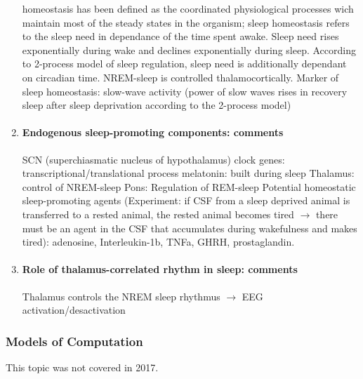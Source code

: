 \documentclass[12pt,article,oneside,a4paper]{memoir}
\begin{document}
\begin{enumerate}
homeostasis has been defined as the coordinated physiological processes wich
maintain most of the steady states in the organism; sleep homeostasis refers to
the sleep need in dependance of the time spent awake. Sleep need rises
exponentially during wake and declines exponentially during sleep. According to
2-process model of sleep regulation, sleep need is additionally dependant on
circadian time.
NREM-sleep is controlled thalamocortically.
Marker of sleep homeostasis: slow-wave activity (power of slow waves rises in
recovery sleep after sleep deprivation according to the 2-process model)

\item \paragraph{Endogenous sleep-promoting components: comments}

SCN (superchiasmatic nucleus of hypothalamus)
clock genes: transcriptional/translational process
melatonin: built during sleep
Thalamus: control of NREM-sleep
Pons: Regulation of REM-sleep
Potential homeostatic sleep-promoting agents (Experiment: if CSF from a sleep
deprived animal is transferred to a rested animal, the rested animal becomes
tired $\rightarrow$ there must be an agent in the CSF that accumulates during
wakefulness and makes tired): adenosine, Interleukin-1b, TNFa, GHRH,
prostaglandin.

\item \paragraph{Role of thalamus-correlated rhythm in sleep: comments}

Thalamus controls the NREM sleep rhythmus $\rightarrow$ EEG
activation/desactivation
\end{enumerate}

\subsubsection{Models of Computation}
This topic was not covered in 2017.
\end{document}
